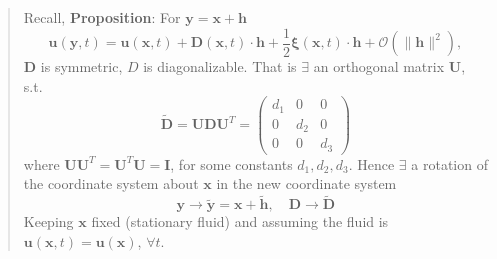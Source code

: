 \begin{quote}
	Recall, \textbf{Proposition}:
For $\textbf{y} = \textbf{x} + \textbf{h}$
\begin{equation}
\textbf{u}(\textbf{y},t) = \textbf{u}(\textbf{x},t) + \textbf{D}(\textbf{x},t)\cdot \textbf{h} + \frac{1}{2}\mathbf{\xi}(\textbf{x},t)\cdot \textbf{h} + \mathcal{O}\left(\lVert \textbf{h}\rVert^2\right),
\end{equation}
$\textbf{D}$ is symmetric, $D$ is diagonalizable. That is $\exists$ an orthogonal matrix $\textbf{U}$, s.t.
\begin{equation}
\widetilde{\textbf{D}} = \textbf{U} \textbf{D} \textbf{U}^{T} = \begin{pmatrix}
d_1 & 0 & 0\\
0 & d_2 & 0\\
0 & 0 & d_3
\end{pmatrix}
\end{equation}
where $\textbf{U}\textbf{U}^{T} = \textbf{U}^{T}\textbf{U} = \textbf{I}$, for some constants $d_1, d_2, d_3$.
Hence $\exists$ a rotation of the coordinate system about $\textbf{x}$ in the new coordinate system
\begin{equation}
\textbf{y} \to \widetilde{\textbf{y}} = \textbf{x} + \widetilde{\textbf{h}},\quad
\textbf{D}\to \widetilde{\textbf{D}}
\end{equation}
Keeping $\textbf{x}$ fixed (stationary fluid) and assuming the fluid is $\textbf{u}(\textbf{x},t) = \textbf{u}(\textbf{x})$, $\forall t$.
\end{quote}



